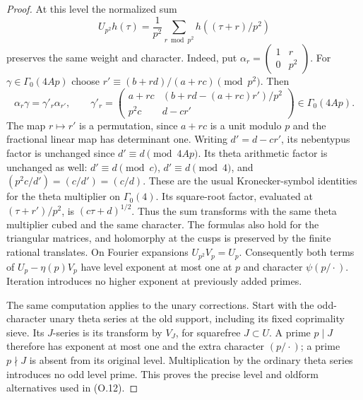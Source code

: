 \begin{proof}
At this level the normalized sum
\[
 U_{p^2}h(\tau)=\frac1{p^2}\sum_{r\bmod p^2}
                             h((\tau+r)/p^2)
\]
preserves the same weight and character. Indeed, put
$\alpha_r=\left(\begin{smallmatrix}1&r\\0&p^2\end{smallmatrix}\right)$.
For $\gamma\in\Gamma_0(4Ap)$ choose
$r'\equiv(b+rd)/(a+rc)\pmod{p^2}$. Then
\[
 \alpha_r\gamma=\gamma'_r\alpha_{r'},\qquad
 \gamma'_r=
 \begin{pmatrix}
  a+rc&(b+rd-(a+rc)r')/p^2\\
  p^2c&d-cr'
 \end{pmatrix}\in\Gamma_0(4Ap).
\]
The map $r\mapsto r'$ is a permutation, since $a+rc$ is a unit
modulo $p$ and the fractional linear map has determinant one.
Writing $d'=d-cr'$, its nebentypus factor is unchanged since
$d'\equiv d\pmod{4Ap}$. Its theta arithmetic factor is unchanged
as well: $d'\equiv d\pmod c$, $d'\equiv d\pmod4$, and
$(p^2c/d')=(c/d')=(c/d)$. These are the usual Kronecker-symbol
identities for the theta multiplier on $\Gamma_0(4)$.
Its square-root factor, evaluated at $(\tau+r')/p^2$, is
$(c\tau+d)^{1/2}$. Thus the sum transforms with the same
theta multiplier cubed and the same character. The formulas also
hold for the triangular matrices, and holomorphy at the cusps is
preserved by the finite rational translates.
On Fourier expansions $U_{p^2}V_p=U_p$. Consequently both terms
of $U_p-\eta(p)V_p$ have level exponent at most one at $p$ and
character $\psi(p/\cdot)$. Iteration introduces no higher exponent
at previously added primes.

The same computation applies to the unary corrections. Start with
the odd-character unary theta series at the old support, including
its fixed coprimality sieve. Its $J$-series is its transform by
$V_J$, for squarefree $J\subset U$. A prime $p\mid J$ therefore
has exponent at most one and the extra character $(p/\cdot)$;
a prime $p\nmid J$ is absent from its original level. Multiplication
by the ordinary theta series introduces no odd level prime. This
proves the precise level and oldform alternatives used in (O.12).



\end{proof}

